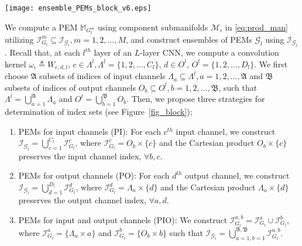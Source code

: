 \documentclass[10pt,journal,compsoc]{IEEEtran}
\theoremstyle{definition}
\theoremstyle{definition}
\theoremstyle{remark}
\theoremstyle{remark}
\theoremstyle{remark}
\begin{document}
\begin{figure*}[t!]
	\centering
	\texttt{[image: ensemble\_PEMs\_block\_v6.eps]}%
	\caption{An illustration for employment of the proposed PI, PO and PIO strategies at the $l^{th}$ layer of a CNN.}
	\label{fig_block}
\end{figure*}

We compute a PEM $\mathbb{M}_{G^m_l}$ using component submanifolds $\mathcal{M}_{\iota}$ in \eqref{eq:prod_man} utilizing ${\mathcal{I}_{{G}_l}^m \subseteq \mathcal{I}_{\mathcal{G}_l}}, m=1,2,\ldots,M$, and construct ensembles of PEMs $\mathcal{G}_l$ using $\mathcal{I}_{\mathcal{G}_l}$. Recall that, at each $l^{th}$ layer of an {$L$-layer} CNN, we compute a convolution kernel ${\omega_{\iota} \triangleq W_{c,d,l}}$, ${c \in \Lambda^l},  \Lambda^l=\{1,2,\ldots,C_l\}$, ${d \in O^l}$, $O^l=\{1,2,\ldots,D_l \}$. We first choose $\mathfrak{A}$ subsets of indices of input channels ${\Lambda_a \subseteq \Lambda^l}, a=1,2,\ldots,\mathfrak{A}$ and $\mathfrak{B}$ subsets of indices of output channels $O_b \subseteq O^l, b=1,2,\ldots,\mathfrak{B}$, such that $\Lambda^l = \bigcup \limits _{a=1} ^\mathfrak{A} \Lambda_a$ and $O^l = \bigcup \limits _{b=1} ^\mathfrak{B} O_b$. Then, we propose three strategies for determination of index sets (see Figure~\ref{fig_block});
\begin{enumerate}[leftmargin=*] %
	\item PEMs for input channels (PI): For each $c^{th}$ input channel, we construct $\mathcal{I}_{\mathcal{G}_l} = \bigcup \limits _{c=1} ^{C_l} \mathcal{I}_{{G}_l} ^c   $, where  ${\mathcal{I}_{{G}_l} ^c =  O_b \times \{c\} }$ and the Cartesian product ${O_b \times \{c\}} $ preserves the input channel index, $\forall b,c$. 	
	\item PEMs for output channels (PO): For each $d^{th}$ output channel, we construct $\mathcal{I}_{\mathcal{G}_l} = \bigcup \limits _{d=1} ^{D_l} \mathcal{I}_{{G}_l} ^d  $, where   ${\mathcal{I}_{{G}_l} ^d = \Lambda_a \times \{d\}  }$ and the Cartesian product $\Lambda_a \times \{d\} $ preserves the output channel index, $\forall a,d$. 	
	\item PEMs for input and output channels (PIO):  We construct $\mathcal{I}_{{G}_l}^{a,b} =  \mathcal{I}_{{G}_l}^{a} \cup  \mathcal{I}_{{G}_l}^{b}$, where $ \mathcal{I}_{{G}_l}^{a} = \{ \Lambda_a \times a \}$ and $ {\mathcal{I}_{{G}_l}^{b} = \{ O_b \times b\} }$  such that $\mathcal{I}_{\mathcal{G}_l} = \bigcup \limits _{a=1, b=1} ^{\mathfrak{A},\mathfrak{B}} \mathcal{I}_{{G}_l} ^{a,b}$.	
\end{enumerate} 
\end{document}

